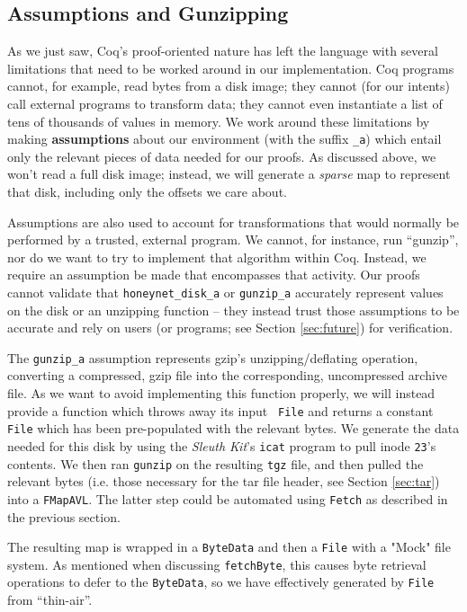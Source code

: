 \documentclass[nocopyrightspace]{sigplanconf}
\begin{document}
\subsection{Assumptions and Gunzipping}
\label{subsec:gunzip}

As we just saw, Coq's proof-oriented nature has left the language with several
limitations that need to be worked around in our implementation. Coq programs
cannot, for example, read bytes from a disk image; they cannot (for our
intents) call external programs to transform data; they cannot even
instantiate a list of tens of thousands of values in memory. We work around
these limitations by making {\bf assumptions} about our environment (with the
suffix {\tt \_a}) which entail only the relevant pieces of data needed for our
proofs. As discussed above, we won't read a full disk image; instead, we will
generate a {\it sparse} map to represent that disk, including only the offsets
we care about.

Assumptions are also used to account for transformations that would normally
be performed by a trusted, external program. We cannot, for instance, run
``gunzip'', nor do we want to try to implement that algorithm within Coq.
Instead, we require an assumption be made that encompasses that activity. Our
proofs cannot validate that {\tt honeynet\_disk\_a} or {\tt gunzip\_a}
accurately represent values on the disk or an unzipping function -- they
instead trust those assumptions to be accurate and rely on users (or programs;
see Section \ref{sec:future}) for verification.

The {\tt gunzip\_a} assumption represents gzip's unzipping/deflating
operation, converting a compressed, gzip file into the corresponding,
uncompressed archive file. As we want to avoid implementing this function
properly, we will instead provide a function which throws away its input {\tt
File} and returns a constant {\tt File} which has been pre-populated with the
relevant bytes. We generate the data needed for this disk by using the {\it
Sleuth Kit}'s {\tt icat} program to pull inode {\tt 23}'s contents. We then
ran {\tt gunzip} on the resulting {\tt tgz} file, and then pulled the relevant
bytes (i.e. those necessary for the tar file header, see Section
\ref{sec:tar}) into a {\tt FMapAVL}. The latter step could be automated using
{\tt Fetch} as described in the previous section.

The resulting map is wrapped in a {\tt ByteData} and then a {\tt File} with a
"Mock" file system. As mentioned when discussing {\tt fetchByte}, this causes
byte retrieval operations to defer to the {\tt ByteData}, so we have
effectively generated by {\tt File} from ``thin-air''.
\end{document}
